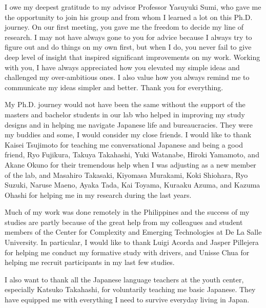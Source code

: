 I owe my deepest gratitude to my advisor Professor Yasuyuki Sumi, who gave me the opportunity to join his group and from whom I learned a lot on this Ph.D. journey. On our first meeting, you gave me the freedom to decide my line of research. I may not have always gone to you for advice because I always try to figure out and do things on my own first, but when I do, you never fail to give deep level of insight that inspired significant improvements on my work. Working with you, I have always appreciated how you elevated my simple ideas and challenged my over-ambitious ones. I also value how you always remind me to communicate my ideas simpler and better. Thank you for everything.

My Ph.D. journey would not have been the same without the support of the masters and bachelor students in our lab who helped in improving my study designs and in helping me navigate Japanese life and bureaucracies. They were my buddies and some, I would consider my close friends. I would like to thank Kaisei Tsujimoto for teaching me conversational Japanese and being a good friend, Ryo Fujikura, Takuya Takahashi, Yuki Watanabe, Hiroki Yamamoto, and Akane Okuno for their tremendous help when I was adjusting as a new member of the lab, and Masahiro Takasaki, Kiyomasa Murakami, Koki Shiohara, Ryo Suzuki, Naruse Maeno, Ayaka Tada, Kai Toyama, Kuraaku Azuma, and Kazuma Ohashi for helping me in my research during the last years.

Much of my work was done remotely in the Philippines and the success of my studies are partly because of the great help from my colleagues and student members of the Center for Complexity and Emerging Technologies at De La Salle University. In particular, I would like to thank Luigi Acorda and Jasper Pillejera for helping me conduct my formative study with drivers, and Unisse Chua for helping me recruit participants in my last few studies. 

I also want to thank all the Japanese language teachers at the youth center, especially Katsuko Takahashi, for voluntarily teaching me basic Japanese. They have equipped me with everything I need to survive everyday living in Japan.

